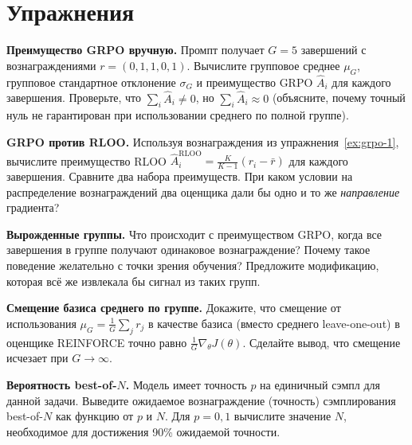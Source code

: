 \section*{Упражнения}

\begin{exercise}
\label{ex:grpo-1}
\textbf{Преимущество GRPO вручную.} Промпт получает $G = 5$ завершений с вознаграждениями $r = (0, 1, 1, 0, 1)$. Вычислите групповое среднее $\mu_G$, групповое стандартное отклонение $\sigma_G$ и преимущество GRPO $\hat{A}_i$ для каждого завершения. Проверьте, что $\sum_i \hat{A}_i \neq 0$, но $\sum_i \hat{A}_i \approx 0$ (объясните, почему точный нуль не гарантирован при использовании среднего по полной группе).
\end{exercise}

\begin{exercise}
\label{ex:grpo-2}
\textbf{GRPO против RLOO.} Используя вознаграждения из упражнения~\ref{ex:grpo-1}, вычислите преимущество RLOO $\hat{A}_i^{\mathrm{RLOO}} = \frac{K}{K-1}(r_i - \bar{r})$ для каждого завершения. Сравните два набора преимуществ. При каком условии на распределение вознаграждений два оценщика дали бы одно и то же \emph{направление} градиента?
\end{exercise}

\begin{exercise}
\label{ex:grpo-3}
\textbf{Вырожденные группы.} Что происходит с преимуществом GRPO, когда все завершения в группе получают одинаковое вознаграждение? Почему такое поведение желательно с точки зрения обучения? Предложите модификацию, которая всё же извлекала бы сигнал из таких групп.
\end{exercise}

\begin{exercise}
\label{ex:grpo-4}
\textbf{Смещение базиса среднего по группе.} Докажите, что смещение от использования $\mu_G = \frac{1}{G}\sum_j r_j$ в качестве базиса (вместо среднего leave-one-out) в оценщике REINFORCE точно равно $\frac{1}{G}\nabla_\theta J(\theta)$. Сделайте вывод, что смещение исчезает при $G \to \infty$.
\end{exercise}

\begin{exercise}
\label{ex:grpo-5}
\textbf{Вероятность best-of-$N$.} Модель имеет точность $p$ на единичный сэмпл для данной задачи. Выведите ожидаемое вознаграждение (точность) сэмплирования best-of-$N$ как функцию от $p$ и $N$. Для $p = 0{,}1$ вычислите значение $N$, необходимое для достижения 90\% ожидаемой точности.
\end{exercise}

